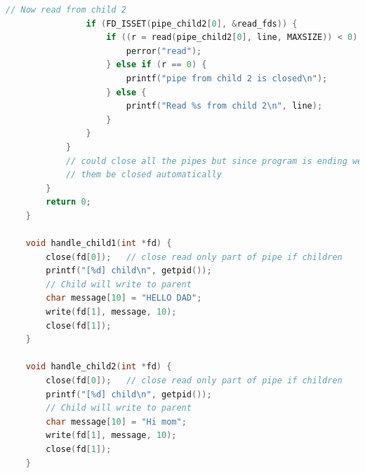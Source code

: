 \documentclass[12pt]{article}
\begin{document}
\begin{itemize}
\begin{lstlisting}[language=c, caption={select\_example\_2\_1.c}]
                // Now read from child 2
                if (FD_ISSET(pipe_child2[0], &read_fds)) {
                    if ((r = read(pipe_child2[0], line, MAXSIZE)) < 0) {
                        perror("read");
                    } else if (r == 0) {
                        printf("pipe from child 2 is closed\n");
                    } else {
                        printf("Read %s from child 2\n", line);
                    }
                }
            }
            // could close all the pipes but since program is ending we will just let
            // them be closed automatically
        }
        return 0;
    }

    void handle_child1(int *fd) {
        close(fd[0]);   // close read only part of pipe if children
        printf("[%d] child\n", getpid());
        // Child will write to parent
        char message[10] = "HELLO DAD";
        write(fd[1], message, 10);
        close(fd[1]);
    }

    void handle_child2(int *fd) {
        close(fd[0]);   // close read only part of pipe if children
        printf("[%d] child\n", getpid());
        // Child will write to parent
        char message[10] = "Hi mom";
        write(fd[1], message, 10);
        close(fd[1]);
    }
    \end{lstlisting}


\end{itemize}
\end{document}

